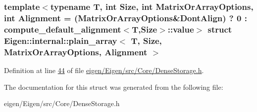 \subsubsection*{template$<$typename T, int Size, int Matrix\+Or\+Array\+Options, int Alignment = (\+Matrix\+Or\+Array\+Options\&\+Dont\+Align) ? 0 \+: compute\+\_\+default\+\_\+alignment$<$\+T,\+Size$>$\+::value$>$\newline
struct Eigen\+::internal\+::plain\+\_\+array$<$ T, Size, Matrix\+Or\+Array\+Options, Alignment $>$}



Definition at line \hyperlink{eigen_2_eigen_2src_2_core_2_dense_storage_8h_source_l00044}{44} of file \hyperlink{eigen_2_eigen_2src_2_core_2_dense_storage_8h_source}{eigen/\+Eigen/src/\+Core/\+Dense\+Storage.\+h}.



The documentation for this struct was generated from the following file\+:\begin{DoxyCompactItemize}
\item 
eigen/\+Eigen/src/\+Core/\+Dense\+Storage.\+h\end{DoxyCompactItemize}

